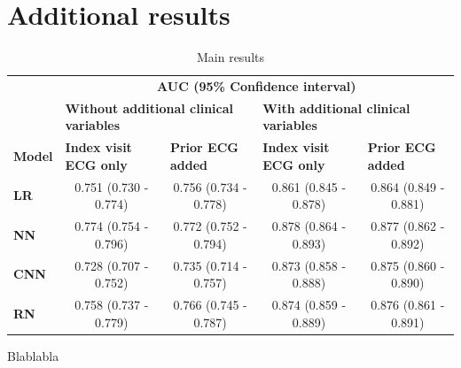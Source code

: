 \documentclass[preprint]{elsarticle}
\begin{document}
\renewcommand{\arraystretch}{1}



\section{Additional results}
\label{sec:appendix:results}

\renewcommand{\arraystretch}{1.2}
\begin{table}[H]
  \centering
  \scriptsize
\begin{adjustbox}{center}
\begin{tabular}{@{}lcccc@{}}
  \toprule
  & \multicolumn{4}{c}{\textbf{AUC (95\% Confidence interval)}} \\
  \cmidrule(lr){2-5}
  & \multicolumn{2}{l}{\textbf{Without additional clinical variables}} & \multicolumn{2}{l}{\textbf{With additional clinical variables}} \\
  \cmidrule(lr){2-3}\cmidrule(lr){4-5}
\textbf{Model} & \multicolumn{1}{l}{\textbf{Index visit ECG only}} & \multicolumn{1}{l}{\textbf{Prior ECG added}} & \multicolumn{1}{l}{\textbf{Index visit ECG only}} & \multicolumn{1}{l}{\textbf{Prior ECG added}} \\
  \midrule

\textbf{LR} & 0.751 (0.730 - 0.774) & 0.756 (0.734 - 0.778) & 0.861 (0.845 - 0.878) & 0.864 (0.849 - 0.881) \\
\textbf{NN} & 0.774 (0.754 - 0.796) & 0.772 (0.752 - 0.794) & 0.878 (0.864 - 0.893) & 0.877 (0.862 - 0.892) \\
\textbf{CNN} & 0.728 (0.707 - 0.752) & 0.735 (0.714 - 0.757) & 0.873 (0.858 - 0.888) & 0.875 (0.860 - 0.890) \\
\textbf{RN} & 0.758 (0.737 - 0.779) & 0.766 (0.745 - 0.787) & 0.874 (0.859 - 0.889) & 0.876 (0.861 - 0.891) \\

\bottomrule
\end{tabular}
\end{adjustbox}
\caption{Main results}
\medskip
\small
Blablabla
\label{table:appendix:mainresults}
\end{table}
\renewcommand{\arraystretch}{1}
\end{document}
